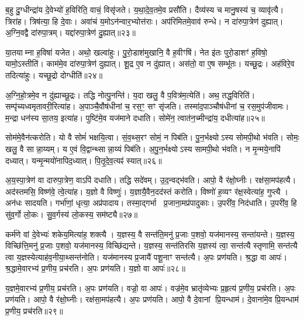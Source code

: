 ब॒हु दु॒ग्धीन्द्रा॑य दे॒वेभ्यो॑ ह॒विरिति॒ वाचं॒ विसृ॑जते।
य॒था॒दे॒व॒तमे॒व प्रसौ॑ति।
दैव्य॑स्य च मानु॒षस्य॑ च॒ व्यावृ॑त्यै।
त्रिरा॑ह।
त्रिष॑त्या॒ हि दे॒वाः।
अवा॑चं य॒मो\-ऽन॑न्वार॒भ्योत्त॑राः।
अप॑रिमितमे॒वाव॑ रुन्धे।
न दा॑रुपा॒त्रेण॑ दुह्यात्।
अ॒ग्नि॒वद्वै दा॑रुपा॒त्रम्।
यद्दा॑रुपा॒त्रेण॑ दु॒ह्यात्॥२३॥

या॒तयाम्ना ह॒विषा॑ यजेत।
अथो॒ खल्वा॑हुः।
पु॒रो॒डाश॑मुखानि॒ वै ह॒वीꣳषि॑।
नेत इ॑तः पुरो॒डाशꣳ॑ ह॒विषो॒ यामो॒\-ऽस्तीति॑।
काम॑मे॒व दा॑रुपा॒त्रेण॑ दुह्यात्।
शू॒द्र ए॒व न दु॑ह्यात्।
अस॑तो॒ वा ए॒ष सम्भू॑तः।
यच्छू॒द्रः।
अह॑विरे॒व तदित्या॑हुः।
यच्छू॒द्रो दोग्धीति॑॥२४॥

अ॒ग्नि॒हो॒त्रमे॒व न दु॑ह्याच्छू॒द्रः।
तद्धि नोत्पु॒नन्ति॑।
य॒दा खलु॒ वै प॒वित्र॑म॒त्येति॑।
अथ॒ तद्ध॒विरिति॑।
सम्पृ॑च्यध्वमृतावरी॒रित्या॑ह।
अ॒पाञ्चै॒वौष॑धीनां च॒ रस॒ꣳ॒ सꣳ सृ॑जति।
तस्मा॑द॒पाञ्चौष॑धीनां च॒ रस॒मुप॑जीवामः।
म॒न्द्रा धन॑स्य सा॒तय॒ इत्या॑ह।
पुष्टि॑मे॒व यज॑माने दधाति।
सोमे॑न॒ त्वात॑न॒च्मीन्द्रा॑य॒ दधीत्या॑ह॥२५॥

सोम॑मे॒वैन॑त्करोति।
यो वै सोमं॑ भक्षयि॒त्वा।
सं॒व॒थ्स॒रꣳ सोमं॒ न पिब॑ति।
पु॒न॒र्भक्ष्योऽस्य सोमपी॒थो भ॑वति।
सोमः॒ खलु॒ वै सान्ना॒य्यम्।
य ए॒वं वि॒द्वान्थ्सान्ना॒य्यं पिब॑ति।
अ॒पु॒न॒र्भक्ष्योऽस्य सामपी॒थो भ॑वति।
न मृ॒न्मये॒नापि॑ दध्यात्।
यन्मृ॒न्मयो॑नापिद॒ध्यात्।
पि॒तृ॒दे॒व॒त्यꣴ॑ स्यात्॥२६॥

अ॒य॒स्पा॒त्रेण॑ वा दारुपा॒त्रेण॒ वाऽपि॑ दधाति।
तद्धि सदे॑वम्।
उ॒द॒न्वद्भ॑वति।
आपो॒ वै र॑क्षो॒घ्नीः।
रक्ष॑सा॒मप॑हत्यै।
अद॑स्तमसि॒ विष्ण॑वे॒ त्वे॒त्या॑ह।
य॒ज्ञो वै विष्णुः॑।
य॒ज्ञायै॒वैन॒दद॑स्तं करोति।
विष्णो॑ ह॒व्यꣳ र॑क्ष॒स्वेत्या॑ह॒ गुप्त्यै।
अन॑धः सादयति।
गर्भा॑णां॒ धृत्या॒ अप्र॑पादाय।
तस्मा॒द्गर्भा प्र॒जाना॒मप्र॑पादुकाः।
उ॒परी॑व॒ निद॑धाति।
उ॒परी॑व॒ हि सु॑व॒र्गो लो॒कः।
सु॒व॒र्गस्य॑ लो॒कस्य॒ सम॑ष्ट्यै॥२७॥

कर्म॑णे वां दे॒वेभ्यः॑ शकेय॒मित्या॑ह॒ शक्त्यै।
य॒ज्ञस्य॒ वै सन्त॑ति॒मनु॑ प्र॒जाः प॒शवो॒ यज॑मानस्य॒ सन्ता॑यन्ते।
य॒ज्ञस्य॒ विच्छि॑त्ति॒मनु॑ प्र॒जाः प॒शवो॒ यज॑मानस्य॒ विच्छि॑द्यन्ते।
य॒ज्ञस्य॒ सन्त॑तिरसि य॒ज्ञस्य॑ त्वा॒ सन्त॑त्यै स्तृणामि॒ सन्त॑त्यै त्वा य॒ज्ञस्येत्याह॑व॒नीया॒थ्सन्त॑नोति।
यज॑मानस्य प्र॒जायै॑ पशू॒नाꣳ सन्त॑त्यै।
अ॒पः प्रण॑यति।
श्र॒द्धा वा आपः॑।
श्र॒द्धामे॒वारभ्य॑ प्र॒णीय॒ प्रच॑रति।
अ॒पः प्रण॑यति।
य॒ज्ञो वा आपः॑॥२८॥

य॒ज्ञमे॒वारभ्य॑ प्र॒णीय॒ प्रच॑रति।
अ॒पः प्रण॑यति।
वज्रो॒ वा आपः॑।
वज्र॑मे॒व भ्रातृ॑व्येभ्यः प्र॒हृत्य॑ प्र॒णीय॒ प्रच॑रति।
अ॒पः प्रण॑यति।
आपो॒ वै र॑क्षो॒घ्नीः।
रक्ष॑सा॒मप॑हत्यै।
अ॒पः प्रण॑यति।
आपो॒ वै दे॒वानां प्रि॒यन्धाम॑।
दे॒वाना॑मे॒व प्रि॒यन्धाम॑ प्र॒णीय॒ प्रच॑रति॥२९॥

